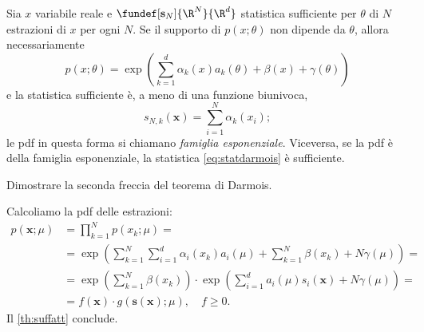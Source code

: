\begin{fact}
	\label{th:darmois}
	Sia $x$ variabile reale e $\fundef[\mathbf s_N]{\R^N}{\R^d}$ statistica sufficiente per $\theta$ di $N$ estrazioni di $x$ per ogni $N$.
	Se il supporto di $p(x;\theta)$ non dipende da $\theta$, allora necessariamente
	\begin{equation*}
		p(x;\theta) =
		\exp \left( \sum_{k=1}^d \alpha_k(x)a_k(\theta) + \beta(x) + \gamma(\theta) \right)
	\end{equation*}
	e la statistica sufficiente è, a meno di una funzione biunivoca,
	\begin{equation}
		\label{eq:statdarmois}
		s_{N,k}(\mathbf x) = \sum_{i=1}^{N} \alpha_k(x_i);
	\end{equation}
	le pdf in questa forma si chiamano \emph{famiglia esponenziale}.
	Viceversa, se la pdf è della famiglia esponenziale, la statistica \eqref{eq:statdarmois} è sufficiente.
\end{fact}

\begin{exercise}
	Dimostrare la seconda freccia del teorema di Darmois.
\end{exercise}

\begin{solution}
	Calcoliamo la pdf delle estrazioni:
	\begin{align*}
		p(\mathbf x;\mu)
		&= \prod_{k=1}^N p(x_k;\mu) = \\
		&= \exp \left( \sum_{k=1}^N \sum_{i=1}^d \alpha_i(x_k)a_i(\mu)
		+ \sum_{k=1}^N \beta(x_k) + N\gamma(\mu) \right) = \\
		&= \exp \left( \sum_{k=1}^N \beta(x_k) \right)
		\cdot \exp \left( \sum_{i=1}^d a_i(\mu)s_i(\mathbf x) + N\gamma(\mu) \right) = \\
		&= f(\mathbf x) \cdot g(\mathbf s(\mathbf x);\mu), \quad f\ge0.
	\end{align*}
	Il \autoref{th:suffatt} conclude.
\end{solution}
